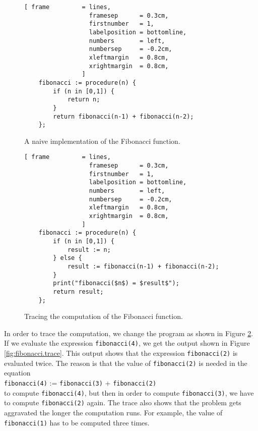 \begin{figure}[!ht]
\centering
\begin{Verbatim}[ frame         = lines, 
                  framesep      = 0.3cm, 
                  firstnumber   = 1,
                  labelposition = bottomline,
                  numbers       = left,
                  numbersep     = -0.2cm,
                  xleftmargin   = 0.8cm,
                  xrightmargin  = 0.8cm,
                ]
    fibonacci := procedure(n) {
        if (n in [0,1]) {
            return n;
        }
        return fibonacci(n-1) + fibonacci(n-2);
    };
\end{Verbatim}
\vspace*{-0.3cm}
\caption{A naive implementation of the Fibonacci function.}
\label{fig:fibonacci.stlx}
\end{figure}

\begin{figure}[!ht]
\centering
\begin{Verbatim}[ frame         = lines, 
                  framesep      = 0.3cm, 
                  firstnumber   = 1,
                  labelposition = bottomline,
                  numbers       = left,
                  numbersep     = -0.2cm,
                  xleftmargin   = 0.8cm,
                  xrightmargin  = 0.8cm,
                ]
    fibonacci := procedure(n) {
        if (n in [0,1]) {
            result := n;
        } else {
            result := fibonacci(n-1) + fibonacci(n-2);
        }
        print("fibonacci($n$) = $result$");
        return result;
    };
\end{Verbatim}
\vspace*{-0.3cm}
\caption{Tracing the computation of the Fibonacci function.}
\label{fig:fibonacci-trace.stlx}
\end{figure}

In order to trace the computation, we change the program as shown in Figure
\ref{fig:fibonacci-trace.stlx}.  
If we evaluate the expression \texttt{fibonacci(4)}, we get the output shown in Figure
\ref{fig:fibonacci.trace}.  This output shows that the expression \texttt{fibonacci(2)} is
evaluated twice.  The reason is that the value of \texttt{fibonacci(2)} is needed in the equation
\\[0.2cm]
\hspace*{1.3cm}
\texttt{fibonacci(4)} := \texttt{fibonacci(3)} + \texttt{fibonacci(2)}
\\[0.2cm]
to compute \texttt{fibonacci(4)}, but then in order to compute \texttt{fibonacci(3)}, we
have to compute \texttt{fibonacci(2)} again.  The trace also shows that the problem gets
aggravated the longer the computation runs.  For example, the value of
\texttt{fibonacci(1)} has to be computed three times.


